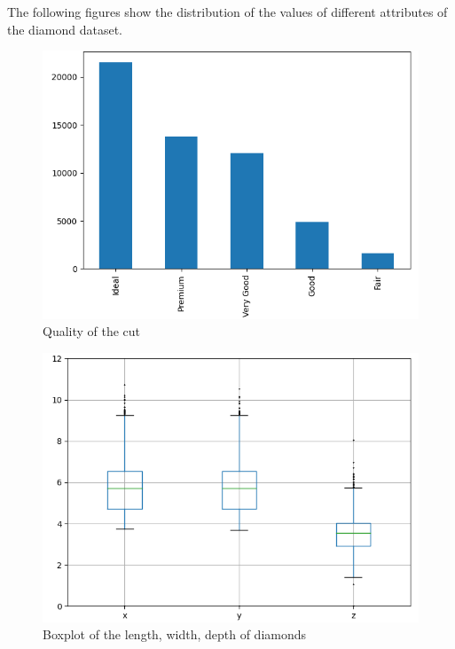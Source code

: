 \documentclass[a4paper,12pt]{article}
\begin{document}
	The following figures show the distribution of the values of different attributes of the diamond dataset.
	
	\begin{figure}[h]
		\centering
		\includegraphics[width=0.7\linewidth]{images/diamond_cut}
		\caption{Quality of the cut}
		\label{fig:diamondcut}
	\end{figure}

	\begin{figure}[h]
		\centering
		\includegraphics[width=0.65\linewidth]{images/diamond_axis}
		\caption{Boxplot of the length, width, depth of diamonds}
		\label{fig:diamondaxis}
	\end{figure}
\end{document}
